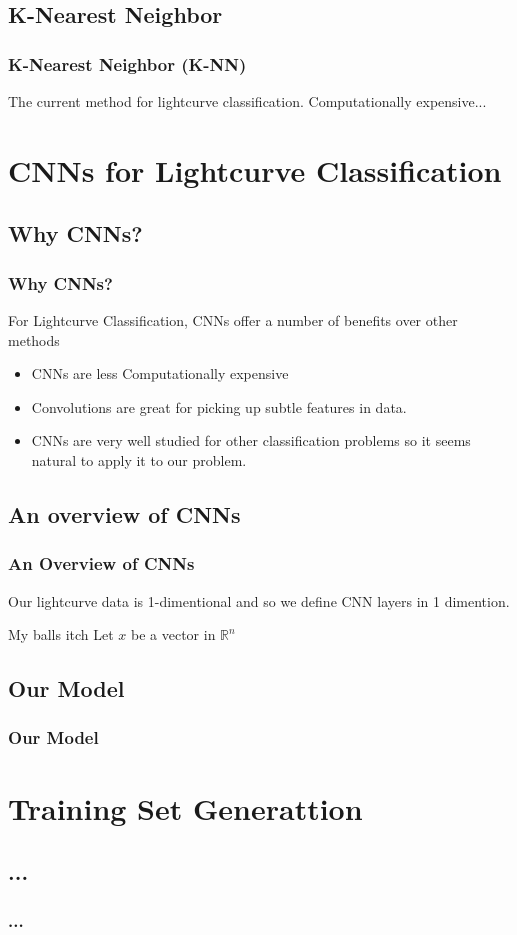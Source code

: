 \documentclass[
	11pt, %
]{beamer}
\begin{document}
\subsection{K-Nearest Neighbor}
\begin{frame}
	\frametitle{K-Nearest Neighbor (K-NN)}
	The current method for lightcurve classification.
	Computationally expensive...
\end{frame}
\section{CNNs for Lightcurve Classification}
\subsection{Why CNNs?}
\begin{frame}
	\frametitle{Why CNNs?}
	For Lightcurve Classification, CNNs offer a number of benefits over other methods
	\begin{itemize}
		\item
			CNNs are less Computationally expensive
		\item
			Convolutions are great for picking up subtle features in data.
		\item
			CNNs are very well studied for other classification problems so it seems natural to apply it to our problem.
	\end{itemize}
\end{frame}
\subsection{An overview of CNNs}
\begin{frame}
	\frametitle{An Overview of CNNs}
	Our lightcurve data is 1-dimentional and so we define CNN layers in 1 dimention.
	\begin{block}{My balls itch}
		Let $x$ be a vector in $\mathbb{R}^n$
	\end{block}
\end{frame}
\subsection{Our Model}
\begin{frame}
	\frametitle{Our Model}
\end{frame}
\section{Training Set Generattion}
\subsection{...}
\begin{frame}
	\frametitle{...}
\end{frame}
\end{document}
